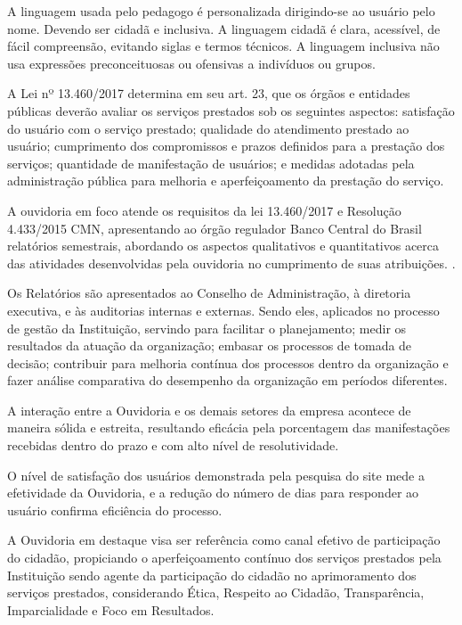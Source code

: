 \begin{refsection}
    A linguagem usada pelo pedagogo é personalizada dirigindo-se ao usuário pelo nome. Devendo ser cidadã e inclusiva. A linguagem cidadã é clara, acessível, de fácil compreensão, evitando siglas e termos técnicos. A linguagem inclusiva não usa expressões preconceituosas ou ofensivas a indivíduos ou grupos.       

    A Lei nº 13.460/2017 determina em seu art. 23, que os órgãos e entidades públicas deverão avaliar os serviços prestados sob os seguintes aspectos: satisfação do usuário com o serviço prestado; qualidade do atendimento prestado ao usuário; cumprimento dos compromissos e prazos definidos para a prestação dos serviços; quantidade de manifestação de usuários; e medidas adotadas pela administração pública para melhoria e aperfeiçoamento da prestação do serviço. 

    A ouvidoria em foco atende os requisitos da lei 13.460/2017 e Resolução 4.433/2015 CMN, apresentando ao órgão regulador Banco Central do Brasil relatórios semestrais, abordando os aspectos qualitativos e quantitativos acerca das atividades desenvolvidas pela ouvidoria no cumprimento de suas atribuições. \cite{Lei13460-2017}.  

    Os Relatórios são apresentados ao Conselho de Administração, à diretoria executiva, e às auditorias internas e externas. Sendo eles, aplicados no processo de gestão da Instituição, servindo para facilitar o planejamento; medir os resultados da atuação da organização; embasar os processos de tomada de decisão; contribuir para melhoria contínua dos processos dentro da organização e fazer análise comparativa do desempenho da organização em períodos diferentes. 

    A interação entre a Ouvidoria e os demais setores da empresa acontece de maneira sólida e estreita, resultando eficácia pela porcentagem das manifestações recebidas dentro do prazo e com alto nível de resolutividade.  

    O nível de satisfação dos usuários demonstrada pela pesquisa do site mede a efetividade da Ouvidoria, e a redução do número de dias para responder ao usuário confirma eficiência do processo. 

    A Ouvidoria em destaque visa ser referência como canal efetivo de participação do cidadão, propiciando o aperfeiçoamento contínuo dos serviços prestados pela Instituição sendo agente da participação do cidadão no aprimoramento dos serviços prestados, considerando Ética, Respeito ao Cidadão, Transparência, Imparcialidade e Foco em Resultados. 


\end{refsection}
